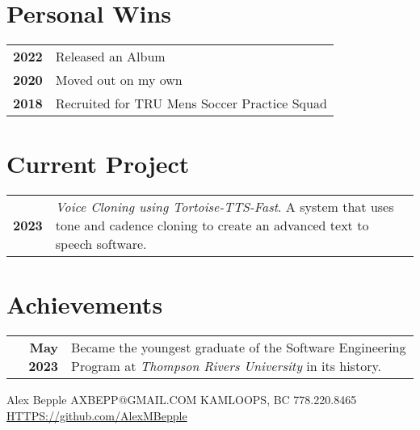 \documentclass[darkhipster]{simplehipstercv}
\newlength{\rightcolwidth}
\begin{document}
\begin{paracol}{2}
\begin{minipage}[t]{0.3\textwidth}
\section*{Personal Wins}
\begin{tabular}{>{\footnotesize\bfseries}r >{\footnotesize}p{}}
    2022 & Released an Album \\
    2020 & Moved out on my own \\
    2018 & Recruited for TRU Mens Soccer Practice Squad    
\end{tabular}
\bigskip
\end{minipage}\hfill
\begin{minipage}[t]{0.3\textwidth}
\section*{Current Project}
\begin{tabular}{>{\footnotesize\bfseries}r >{\footnotesize}p{}}
    2023 & \emph{Voice Cloning using Tortoise-TTS-Fast}. A system that uses tone and cadence cloning to create an advanced text to speech software. \\
\end{tabular}
\bigskip

\section*{Achievements}
\begin{tabular}{>{\footnotesize\bfseries}r >{\footnotesize}p{}}
    May 2023 & Became the youngest graduate of the Software Engineering Program at \emph{Thompson Rivers University} in its history.
\end{tabular}
\end{minipage}

\vfill{} %

\setlength{\parindent}{0pt}
\begin{minipage}[t]{\rightcolwidth}
\begin{center}\fontfamily{\sfdefault}\selectfont \color{black!70}
{\small Alex Bepple  AXBEPP@GMAIL.COM  KAMLOOPS, BC  778.220.8465 \newline{} \protect\url{HTTPS://github.com/AlexMBepple}
}
\end{center}
\end{minipage}

\end{paracol}
\end{document}
